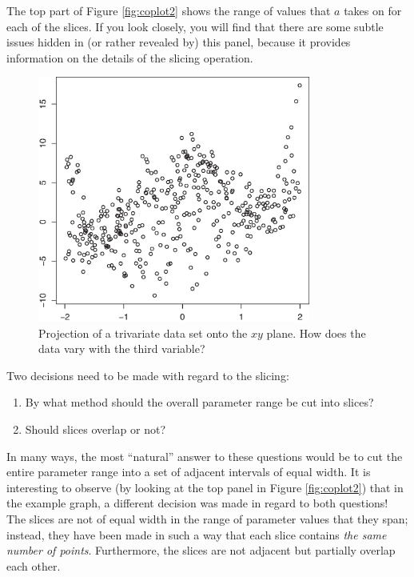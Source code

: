 The top part of Figure \ref{fig:coplot2} shows the range of values
that $a$ takes on for each of the slices. If you look closely, you
will find that there are some subtle issues hidden in (or rather
revealed by) this panel, because it provides information on the
details of the slicing operation.

\begin{figure}[t!]
   \centerline{\includegraphics[width=0.8\textwidth]{img/coplot1.eps}}
  \caption{Projection of a trivariate data set onto the $xy$ plane. 
    How does the data vary with the third variable?}
  \label{fig:coplot1}
\end{figure}

Two decisions need to be made with regard to the slicing:
\begin{enumerate}
\item By what method should the overall parameter range be cut into
  slices?
\item Should slices overlap or not?
\end{enumerate}

In many ways, the most ``natural'' answer to these questions would be
to cut the entire parameter range into a set of adjacent intervals of
equal width. It is interesting to observe (by looking at the top panel
in Figure \ref{fig:coplot2}) that in the example graph, a different
decision was made in regard to both questions! The slices are 
not of equal width in the range of parameter values that they span;
instead, they have been made in such a way that each slice contains
\emph{the same number of points}. Furthermore, the slices are not
adjacent but partially overlap each other.

